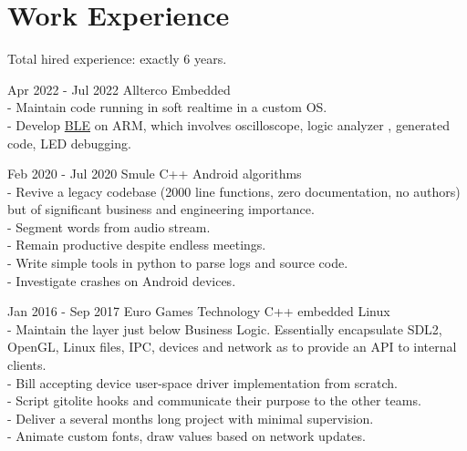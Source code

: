\documentclass{tccv}
\begin{document}
\pagebreak
\section{Work Experience}
Total hired experience: exactly 6 years. \\

\begin{eventlist}
\item{Apr 2022 - Jul 2022}
     {Allterco}
     {Embedded}  \\
- Maintain code running in soft realtime in a custom OS.  \\
- Develop
{\href{https://en.wikipedia.org/wiki/Bluetooth_Low_Energy}{BLE}}
on ARM, which involves oscilloscope, logic analyzer , generated code, LED debugging.  \\

\item{Feb 2020 - Jul 2020}
     {Smule}
     {C++ Android algorithms}  \\
- Revive a legacy codebase (2000 line functions, zero documentation, no authors) but of significant business and engineering importance.  \\
- Segment words from audio stream.  \\
- Remain productive despite endless meetings.  \\
- Write simple tools in python to parse logs and source code.  \\
- Investigate crashes on Android devices.  \\

\item{Jan 2016 - Sep 2017}
     {Euro Games Technology}
     {C++ embedded Linux}  \\
- Maintain the layer just below Business Logic.
  Essentially encapsulate SDL2, OpenGL, Linux files, IPC, devices and network as to provide an API to internal clients.  \\
- Bill accepting device user-space driver implementation from scratch.  \\
- Script gitolite hooks and communicate their purpose to the other teams.  \\
- Deliver a several months long project with minimal supervision.  \\
- Animate custom fonts, draw values based on network updates.  \\


\end{eventlist}
\end{document}
